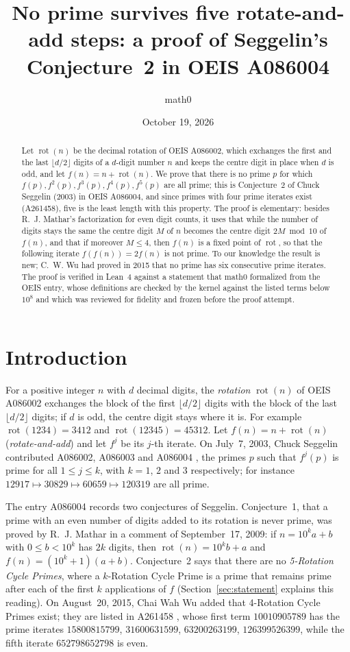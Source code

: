 \documentclass[11pt]{amsart}
\title[No prime survives five rotate-and-add steps]{No prime survives five rotate-and-add steps: a proof of Seggelin's Conjecture~2 in OEIS A086004}
\author{math0}
\date{October 19, 2026}
\theoremstyle{plain}
\theoremstyle{definition}
\DeclareMathOperator{\rot}{rot}
\begin{document}
\begin{abstract}
Let $\rot(n)$ be the decimal rotation of OEIS A086002, which exchanges the first and the last $\lfloor d/2\rfloor$ digits of a $d$-digit number $n$ and keeps the centre digit in place when $d$ is odd, and let $f(n)=n+\rot(n)$.
We prove that there is no prime $p$ for which $f(p),f^2(p),f^3(p),f^4(p),f^5(p)$ are all prime; this is Conjecture~2 of Chuck Seggelin (2003) in OEIS A086004, and since primes with four prime iterates exist (A261458), five is the least length with this property.
The proof is elementary: besides R.~J. Mathar's factorization for even digit counts, it uses that while the number of digits stays the same the centre digit $M$ of $n$ becomes the centre digit $2M\bmod 10$ of $f(n)$, and that if moreover $M\le4$, then $f(n)$ is a fixed point of $\rot$, so that the following iterate $f(f(n))=2f(n)$ is not prime.
To our knowledge the result is new; C.~W. Wu had proved in 2015 that no prime has six consecutive prime iterates.
The proof is verified in Lean~4 against a statement that math0 formalized from the OEIS entry, whose definitions are checked by the kernel against the listed terms below $10^8$ and which was reviewed for fidelity and frozen before the proof attempt.
\end{abstract}
\maketitle

\section{Introduction}

For a positive integer $n$ with $d$ decimal digits, the \emph{rotation} $\rot(n)$ of OEIS A086002 \cite{A086002} exchanges the block of the first $\lfloor d/2\rfloor$ digits with the block of the last $\lfloor d/2\rfloor$ digits; if $d$ is odd, the centre digit stays where it is. For example $\rot(1234)=3412$ and $\rot(12345)=45312$. Let $f(n)=n+\rot(n)$ (\emph{rotate-and-add}) and let $f^j$ be its $j$-th iterate. On July~7, 2003, Chuck Seggelin contributed A086002, A086003 \cite{A086003} and A086004 \cite{A086004}, the primes $p$ such that $f^j(p)$ is prime for all $1\le j\le k$, with $k=1$, $2$ and $3$ respectively; for instance $12917\mapsto30829\mapsto60659\mapsto120319$ are all prime.

The entry A086004 records two conjectures of Seggelin. Conjecture~1, that a prime with an even number of digits added to its rotation is never prime, was proved by R.~J. Mathar in a comment of September~17, 2009: if $n=10^ka+b$ with $0\le b<10^k$ has $2k$ digits, then $\rot(n)=10^kb+a$ and $f(n)=(10^k+1)(a+b)$. Conjecture~2 says that there are no \emph{5-Rotation Cycle Primes}, where a $k$-Rotation Cycle Prime is a prime that remains prime after each of the first $k$ applications of $f$ (Section~\ref{sec:statement} explains this reading). On August~20, 2015, Chai Wah Wu added that 4-Rotation Cycle Primes exist; they are listed in A261458 \cite{A261458}, whose first term $10010905789$ has the prime iterates $15800815799$, $31600631599$, $63200263199$, $126399526399$, while the fifth iterate $652798652798$ is even.
\end{document}
